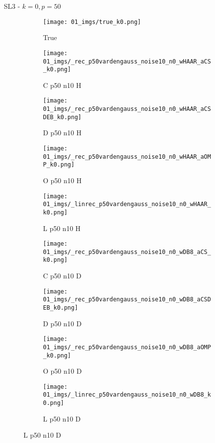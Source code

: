 \begin{frame}{SL3 - $k=0,p=50$}{}
\begin{figure}
\begin{subfigure}{0.1\textwidth}
\texttt{[image: 01\_imgs/true\_k0.png]}
\caption*{\Tiny True}
\end{subfigure}
\begin{subfigure}{0.1\textwidth}
\texttt{[image: 01\_imgs/\_rec\_p50vardengauss\_noise10\_n0\_wHAAR\_aCS\_k0.png]}
\caption*{\Tiny C p50 n10 H}
\end{subfigure}
\begin{subfigure}{0.1\textwidth}
\texttt{[image: 01\_imgs/\_rec\_p50vardengauss\_noise10\_n0\_wHAAR\_aCSDEB\_k0.png]}
\caption*{\Tiny D p50 n10 H}
\end{subfigure}
\begin{subfigure}{0.1\textwidth}
\texttt{[image: 01\_imgs/\_rec\_p50vardengauss\_noise10\_n0\_wHAAR\_aOMP\_k0.png]}
\caption*{\Tiny O p50 n10 H}
\end{subfigure}
\begin{subfigure}{0.1\textwidth}
\texttt{[image: 01\_imgs/\_linrec\_p50vardengauss\_noise10\_n0\_wHAAR\_k0.png]}
\caption*{\Tiny L p50 n10 H}
\end{subfigure}
\begin{subfigure}{0.1\textwidth}
\texttt{[image: 01\_imgs/\_rec\_p50vardengauss\_noise10\_n0\_wDB8\_aCS\_k0.png]}
\caption*{\Tiny C p50 n10 D}
\end{subfigure}
\begin{subfigure}{0.1\textwidth}
\texttt{[image: 01\_imgs/\_rec\_p50vardengauss\_noise10\_n0\_wDB8\_aCSDEB\_k0.png]}
\caption*{\Tiny D p50 n10 D}
\end{subfigure}
\begin{subfigure}{0.1\textwidth}
\texttt{[image: 01\_imgs/\_rec\_p50vardengauss\_noise10\_n0\_wDB8\_aOMP\_k0.png]}
\caption*{\Tiny O p50 n10 D}
\end{subfigure}
\begin{subfigure}{0.1\textwidth}
\texttt{[image: 01\_imgs/\_linrec\_p50vardengauss\_noise10\_n0\_wDB8\_k0.png]}
\caption*{\Tiny L p50 n10 D}
\end{subfigure}

\vspace{5pt}


\end{figure}
\end{frame}
